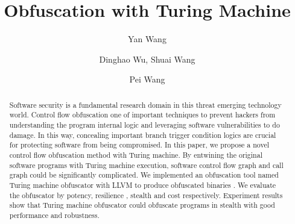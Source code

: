 \documentclass[lnicst]{svmultln}
\begin{document}
%
\mainmatter              %
%
\title{Obfuscation with Turing Machine}
%
%
\author{Yan Wang \and Dinghao Wu,
Shuai Wang \and Pei Wang}
%
%
%
\institute{Pennsylvania State University, State College,PA 16801, USA,\\
\email{ybw5084@ist.psu.edu} %
}
\maketitle              

\begin{abstract}        %
Software security is a fundamental research domain in this threat emerging technology world. Control flow obfuscation one of important techniques to prevent hackers from understanding the program internal logic and leveraging software vulnerabilities to do damage. In this way, concealing important branch trigger condition logics are crucial for protecting software from being compromised. In this paper, we propose a novel control flow obfuscation method with Turing machine. By entwining the original software programs with Turing machine execution, software control flow graph and call graph could be significantly complicated. We implemented an obfuscation tool named Turing machine obfuscator with LLVM to produce obfuscated binaries . We evaluate the obfuscator by potency, resilience , stealth and cost respectively. Experiment results show that Turing machine obfuscator could obfuscate programs in stealth with good performance and robustness. 
\end{abstract}
%
\end{document}
